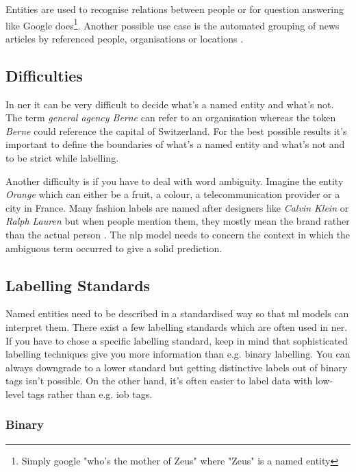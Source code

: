 Entities are used to recognise relations between people or for question answering like Google does\footnote{Simply google "who's
the mother of Zeus" where "Zeus" is a named entity}. Another possible use case is the automated grouping of news articles by
referenced people, organisations or locations \cite{gupta}.

\subsection{Difficulties}

In \acrlong{ner} it can be very difficult to decide what's a named entity and what's not. The term \emph{general agency Berne} can
refer to an organisation whereas the token \emph{Berne} could reference the capital of Switzerland. For the best possible results
it's important to define the boundaries of what's a named entity and what's not and to be strict while labelling.

Another difficulty is if you have to deal with word ambiguity. Imagine the entity \emph{Orange} which can either be a fruit, a colour,
a telecommunication provider or a city in France. Many fashion labels are named after designers like \emph{Calvin Klein} or \emph{Ralph
Lauren} but when people mention them, they mostly mean the brand rather than the actual person \cite{Vogel19}. The \acrshort{nlp} model
needs to concern the context in which the ambiguous term occurred to give a solid prediction.

\subsection{Labelling Standards}

Named entities need to be described in a standardised way so that \acrshort{ml} models can interpret them. There exist a few labelling
standards which are often used in \acrshort{ner}. If you have to chose a specific labelling standard, keep in mind that sophisticated
labelling techniques give you more information than e.g. binary labelling. You can always downgrade to a lower standard but getting
distinctive labels out of binary tags isn't possible. On the other hand, it's often easier to label data with low-level tags rather
than e.g. \acrshort{iob} tags.

\subsubsection{Binary}

